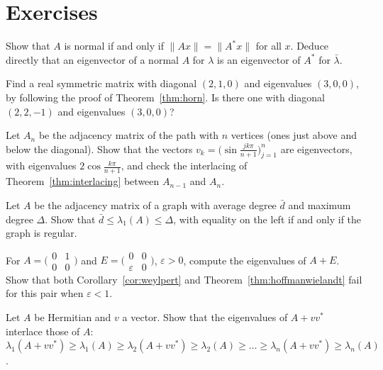 \section{Exercises}

\begin{exercise}[$\star$]\label{ex:normaliff}
Show that $A$ is normal if and only if $\|Ax\|=\|A^*x\|$ for all $x$. Deduce directly that an eigenvector of a normal $A$
for $\lambda$ is an eigenvector of $A^*$ for $\bar\lambda$.
\end{exercise}

\begin{exercise}[$\star$]\label{ex:hornsmall}
Find a real symmetric matrix with diagonal $(2,1,0)$ and eigenvalues $(3,0,0)$, by following the proof of
Theorem~\ref{thm:horn}. Is there one with diagonal $(2,2,-1)$ and eigenvalues $(3,0,0)$?
\end{exercise}

\begin{exercise}[$\star$]\label{ex:pathgraph}
Let $A_n$ be the adjacency matrix of the path with $n$ vertices (ones just above and below the diagonal). Show that the
vectors $v_k=\bigl(\sin\frac{jk\pi}{n+1}\bigr)_{j=1}^n$ are eigenvectors, with eigenvalues $2\cos\frac{k\pi}{n+1}$, and check
the interlacing of Theorem~\ref{thm:interlacing} between $A_{n-1}$ and $A_n$.
\end{exercise}

\begin{exercise}[$\star\star$]\label{ex:degree}
Let $A$ be the adjacency matrix of a graph with average degree $\bar d$ and maximum degree $\Delta$. Show that $\bar d\le
\lambda_1(A)\le\Delta$, with equality on the left if and only if the graph is regular.
\end{exercise}

\begin{exercise}[$\star$]\label{ex:nonnormal}
For $A=\bigl(\begin{smallmatrix}0&1\\0&0\end{smallmatrix}\bigr)$ and $E=\bigl(\begin{smallmatrix}0&0\\\varepsilon&0
\end{smallmatrix}\bigr)$, $\varepsilon>0$, compute the eigenvalues of $A+E$. Show that both Corollary~\ref{cor:weylpert} and
Theorem~\ref{thm:hoffmanwielandt} fail for this pair when $\varepsilon<1$.
\end{exercise}

\begin{exercise}[$\star\star$]\label{ex:rankone}
Let $A$ be Hermitian and $v$ a vector. Show that the eigenvalues of $A+vv^*$ interlace those of $A$:
$\lambda_1(A+vv^*)\ge\lambda_1(A)\ge\lambda_2(A+vv^*)\ge\lambda_2(A)\ge\dots\ge\lambda_n(A+vv^*)\ge\lambda_n(A)$.
\end{exercise}

